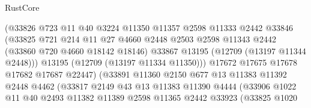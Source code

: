 \begin{lexlean}{RustCore}
\begin{coremodule}
                                (@33826
                                  @723
                                  @11
                                  @40
                                  @3224
                                  @11350
                                  @11357
                                  @2598
                                  @11333
                                  @2442
                                  @33846
                                  (@33825
                                    @721
                                    @214
                                    @11
                                    @27
                                    @4660
                                    @2448
                                    @2503
                                    @2598
                                    @11343
                                    @2442
                                    (@33860 @720 @4660 @18142 @18146)
                                    @33867
                                    @13195
                                    (@12709 (@13197 @11344 @2448)))
                                  @13195
                                  (@12709 (@13197 @11334 @11350)))
                                @17672
                                @17675
                                @17678
                                @17682
                                @17687
                                @22447)
                              (@33891
                                @11360
                                @2150
                                @677
                                @13
                                @11383
                                @11392
                                @2448
                                @4462
                                (@33817
                                  @2149
                                  @43
                                  @13
                                  @11383
                                  @11390
                                  @4444
                                  (@33906
                                    @1022
                                    @11
                                    @40
                                    @2493
                                    @11382
                                    @11389
                                    @2598
                                    @11365
                                    @2442
                                    @33923
                                    (@33825
                                      @1020

\end{coremodule}
\end{lexlean}
